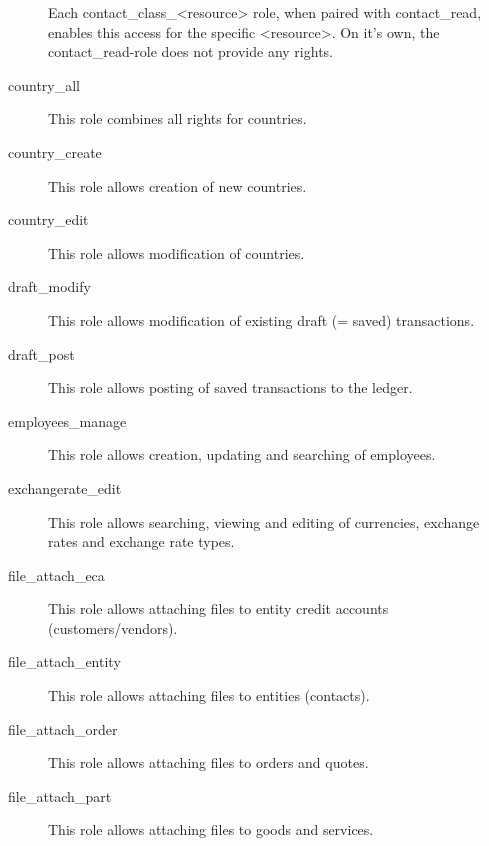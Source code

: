\begin{description}
                         Each contact\_class\_\textless{}resource\textgreater{} role, when paired with contact\_read, enables
                         this access for the specific \textless{}resource\textgreater{}. On it's own, the contact\_read-role
                         does not provide any rights.
\item [country\_all] \htmlspacing 
                         This role combines all rights for countries.
\item [country\_create] \htmlspacing 
                         This role allows creation of new countries.
\item [country\_edit] \htmlspacing 
                         This role allows modification of countries.
\item [draft\_modify] \htmlspacing 
                         This role allows modification of existing draft (= saved) transactions.
\item [draft\_post] \htmlspacing 
                         This role allows posting of saved transactions to the ledger.
\item [employees\_manage] \htmlspacing 
                         This role allows creation, updating and searching of employees.
\item [exchangerate\_edit] \htmlspacing 
                         This role allows searching, viewing and editing of currencies, exchange rates and exchange rate types.
\item [file\_attach\_eca] \htmlspacing 
                         This role allows attaching files to entity credit accounts (customers/vendors).
\item [file\_attach\_entity] \htmlspacing 
                         This role allows attaching files to entities (contacts).
\item [file\_attach\_order] \htmlspacing 
                         This role allows attaching files to orders and quotes.
\item [file\_attach\_part] \htmlspacing 
                         This role allows attaching files to goods and services.

\end{description}

